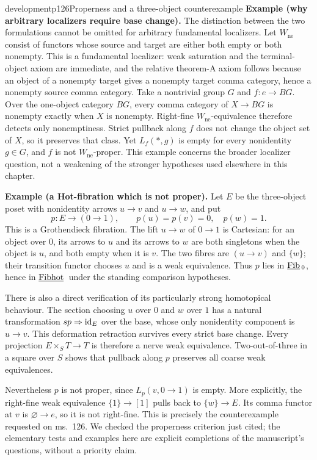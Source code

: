 \begin{dcomment}{development}{p126}{Properness and a three-object counterexample}
\textbf{Example (why arbitrary localizers require base change).}\ours
The distinction between the two formulations cannot be omitted for arbitrary fundamental localizers. Let $W_{\mathrm{ne}}$ consist of functors whose source and target are either both empty or both nonempty. This is a fundamental localizer: weak saturation and the terminal-object axiom are immediate, and the relative theorem-A axiom follows because an object of a nonempty target gives a nonempty target comma category, hence a nonempty source comma category. Take a nontrivial group $G$ and $f:e\to BG$. Over the one-object category $BG$, every comma category of $X\to BG$ is nonempty exactly when $X$ is nonempty. Right-fine $W_{\mathrm{ne}}$-equivalence therefore detects only nonemptiness. Strict pullback along $f$ does not change the object set of $X$, so it preserves that class. Yet $L_f(*,g)$ is empty for every nonidentity $g\in G$, and $f$ is not $W_{\mathrm{ne}}$-proper. This example concerns the broader localizer question, not a weakening of the stronger hypotheses used elsewhere in this chapter.

\textbf{Example (a Hot-fibration which is not proper).}\ours
Let $E$ be the three-object poset with nonidentity arrows $u\to v$ and $u\to w$, and put
\[
 p:E\longrightarrow(0\to1),\qquad p(u)=p(v)=0,\quad p(w)=1.
\]
This is a Grothendieck fibration. The lift $u\to w$ of $0\to1$ is Cartesian: for an object over $0$, its arrows to $u$ and its arrows to $w$ are both singletons when the object is $u$, and both empty when it is $v$. The two fibres are $(u\to v)$ and $\{w\}$; their transition functor chooses $u$ and is a weak equivalence. Thus $p$ lies in $\underline{\mathrm{Fib}}\,_0$, hence in $\underline{\mathrm{Fibhot}}\,$ under the standing comparison hypotheses.

There is also a direct verification of its particularly strong homotopical behaviour. The section choosing $u$ over $0$ and $w$ over $1$ has a natural transformation $sp\Rightarrow\mathrm{id}_E$ over the base, whose only nonidentity component is $u\to v$. This deformation retraction survives every strict base change. Every projection $E\times_S T\to T$ is therefore a nerve weak equivalence. Two-out-of-three in a square over $S$ shows that pullback along $p$ preserves all coarse weak equivalences.

Nevertheless $p$ is not proper, since $L_p(v,0\to1)$ is empty. More explicitly, the right-fine weak equivalence $\{1\}\to[1]$ pulls back to $\{w\}\to E$. Its comma functor at $v$ is $\varnothing\to e$, so it is not right-fine. This is precisely the counterexample requested on ms.~126. We checked the properness criterion just cited; the elementary tests and examples here are explicit completions of the manuscript's questions, without a priority claim.
\end{dcomment}


